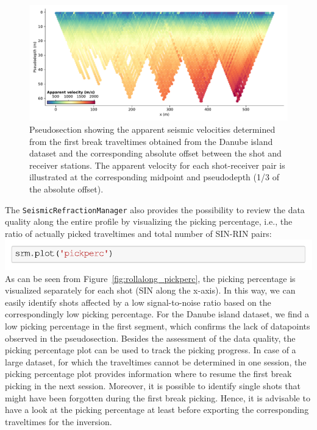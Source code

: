 \documentclass[a4paper,fleqn]{cas-sc}
\begin{document}
\begin{figure}
	\centering
	\includegraphics[width=.75\textwidth]{figures/rollalong_pseudosection.pdf}
	\caption{Pseudosection showing the apparent seismic velocities determined from the first break traveltimes obtained from the Danube island dataset and the corresponding absolute offset between the shot and receiver stations. The apparent velocity for each shot-receiver pair is illustrated at the corresponding midpoint and pseudodepth (1/3 of the absolute offset).}
	\label{fig:rollalong_pseudosection}
\end{figure}

The \texttt{SeismicRefractionManager} also provides the possibility to review the data quality along the entire profile by visualizing the picking percentage, i.e., the ratio of actually picked traveltimes and total number of SIN-RIN pairs:
\newline
\includegraphics[width=.5\textwidth]{./figures/plot_pickperc_danube.pdf}
\newline
As can be seen from Figure~\ref{fig:rollalong_pickperc}, the picking percentage is visualized separately for each shot (SIN along the x-axis). In this way, we can easily identify shots affected by a low signal-to-noise ratio based on the correspondingly low picking percentage. For the Danube island dataset, we find a low picking percentage in the first segment, which confirms the lack of datapoints observed in the pseudosection.
Besides the assessment of the data quality, the picking percentage plot can be used to  track the picking progress. In case of a large dataset, for which the traveltimes cannot be determined in one session, the picking percentage plot provides information where to resume the first break picking in the next session. Moreover, it is possible to identify single shots that might have been forgotten during the first break picking. Hence, it is advisable to have a look at the picking percentage at least before exporting the corresponding traveltimes for the inversion.
\end{document}
